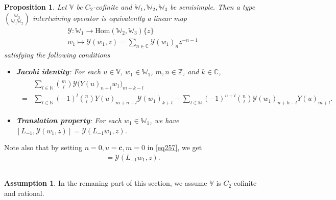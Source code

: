 \documentclass[12pt,a4paper,notitlepage]{article}
\theoremstyle{definition}
\newtheorem{ass}[df]{Assumption}
\theoremstyle{plain}
\newtheorem{pp}[df]{Proposition}
\newcommand{\mc}{\mathcal}
\newcommand{\wtd}{\widetilde}
\newcommand{\Hom}{\mathrm{Hom}}
\newcommand{\Vbb}{\mathbb V}
\newcommand{\Wbb}{\mathbb W}
\newcommand{\Cbb}{\mathbb C}
\newcommand{\Nbb}{\mathbb N}
\newcommand{\Zbb}{\mathbb Z}
\newcommand{\cbf}{\mathbf c}
\numberwithin{equation}{section}
\begin{document}
\begin{pp}
Let $\Vbb$ be $C_2$-cofinite and $\Wbb_1,\Wbb_2,\Wbb_3$ be semisimple. Then a type $\Wbb_3\choose \Wbb_1\Wbb_2$ intertwining operator is equivalently a linear map
\begin{gather*}
\mc Y:\Wbb_1\rightarrow\Hom(\Wbb_2,\Wbb_3)\{z\}\\
w_1\mapsto \mc Y(w_1,z)=\sum_{n\in\Cbb}\mc Y(w_1)_nz^{-n-1}
\end{gather*}
satisfying the following conditions
\begin{itemize}
\item \textbf{Jacobi identity}: For each $u\in\Vbb$, $w_1\in\Wbb_1$, $m,n\in\Zbb$, and $k\in\Cbb$,
\begin{align}
	\begin{aligned}
&\sum_{l\in\Nbb}{m\choose l}\mc Y\big(Y(u)_{n+l}w_1\big)_{m+k-l}\\
=&\sum_{l\in\Nbb}(-1)^l{n\choose l}Y(u)_{m+n-l}\mc Y(w_1)_{k+l}-\sum_{l\in\Nbb}(-1)^{n+l}{n\choose l}\mc Y(w_1)_{n+k-l} Y(u)_{m+l}	.
	\end{aligned}
\end{align}
\item \textbf{Translation property}: For each $w_1\in\Wbb_1$, we have $[L_{-1},\mc Y(w_1,z)]=\mc Y(L_{-1}w_1,z)$.
\end{itemize}
\end{pp}

Note also that by  setting $n=0,u=\cbf,m=0$ in \eqref{eq257}, we get
\begin{align}
[L_{-1},\mc Y(w_1,z)]=\mc Y(L_{-1}w_1,z).\label{eq262}
\end{align}


\subsection{}

\begin{ass}
In the remaning part of this section, we assume $\Vbb$ is $C_2$-cofinite and rational. 
\end{ass}
\end{document}

